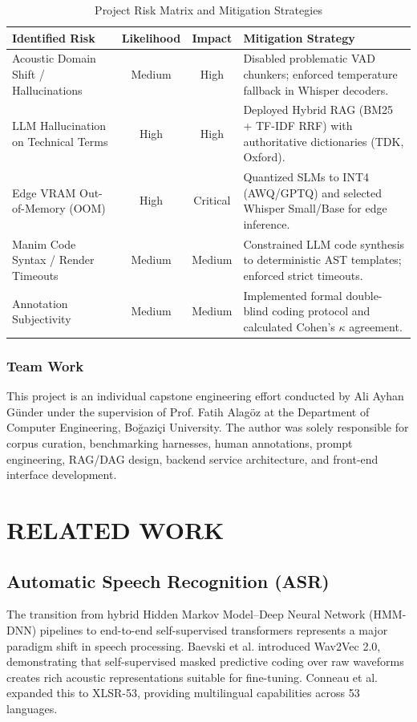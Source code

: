 \documentclass[a4paper,12pt]{report}
\begin{document}
\begin{table}[h!]
\centering
\caption{Project Risk Matrix and Mitigation Strategies}
\label{table:risk_analysis}
\baselineskip
\small
\begin{tabularx}{\textwidth}{|l|c|c|X|}
\hline
\textbf{Identified Risk} & \textbf{Likelihood} & \textbf{Impact} & \textbf{Mitigation Strategy} \\ \hline
Acoustic Domain Shift / Hallucinations & Medium & High & Disabled problematic VAD chunkers; enforced temperature fallback in Whisper decoders. \\ \hline
LLM Hallucination on Technical Terms & High & High & Deployed Hybrid RAG (BM25 + TF-IDF RRF) with authoritative dictionaries (TDK, Oxford). \\ \hline
Edge VRAM Out-of-Memory (OOM) & High & Critical & Quantized SLMs to INT4 (AWQ/GPTQ) and selected Whisper Small/Base for edge inference. \\ \hline
Manim Code Syntax / Render Timeouts & Medium & Medium & Constrained LLM code synthesis to deterministic AST templates; enforced strict timeouts. \\ \hline
Annotation Subjectivity & Medium & Medium & Implemented formal double-blind coding protocol and calculated Cohen's $\kappa$ agreement. \\ \hline
\end{tabularx}
\end{table}

\subsection{Team Work}
This project is an individual capstone engineering effort conducted by Ali Ayhan Günder under the supervision of Prof. Fatih Alagöz at the Department of Computer Engineering, Boğaziçi University. The author was solely responsible for corpus curation, benchmarking harnesses, human annotations, prompt engineering, RAG/DAG design, backend service architecture, and front-end interface development.


\chapter{RELATED WORK}

\section{Automatic Speech Recognition (ASR)}
The transition from hybrid Hidden Markov Model--Deep Neural Network (HMM-DNN) pipelines to end-to-end self-supervised transformers represents a major paradigm shift in speech processing. Baevski et al. \cite{baevski2020} introduced Wav2Vec 2.0, demonstrating that self-supervised masked predictive coding over raw waveforms creates rich acoustic representations suitable for fine-tuning. Conneau et al. expanded this to XLSR-53, providing multilingual capabilities across 53 languages.
\end{document}
